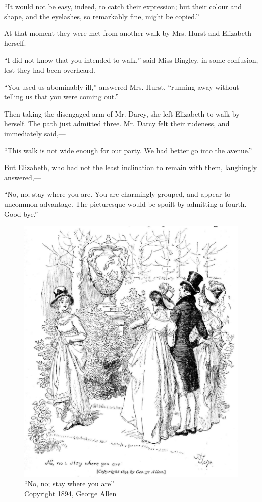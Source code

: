 ``It would not be easy, indeed, to catch their expression; but their colour and shape, and the eyelashes, so remarkably fine, might be copied.''

At that moment they were met from another walk by Mrs. Hurst and Elizabeth herself.

``I did not know that you intended to walk,'' said Miss Bingley, in some confusion, lest they had been overheard.

``You used us abominably ill,'' answered Mrs. Hurst, ``running away without telling us that you were coming out.''

Then taking the disengaged arm of Mr. Darcy, she left Elizabeth to walk by herself. The path just admitted three. Mr. Darcy felt their rudeness, and immediately said,---

``This walk is not wide enough for our party. We had better go into the avenue.''

But Elizabeth, who had not the least inclination to remain with them, laughingly answered,---

``No, no; stay where you are. You are charmingly grouped, and appear to uncommon advantage. The picturesque would be spoilt by admitting a fourth. Good-bye.''



\begin{figure}[htbp]
    \centering
    \includegraphics[width=\textwidth]{illustrations/i_096.jpg}
    \caption{“No, no; stay where you are”\\ Copyright 1894, George Allen}
    \label{fig:image}
\end{figure}


